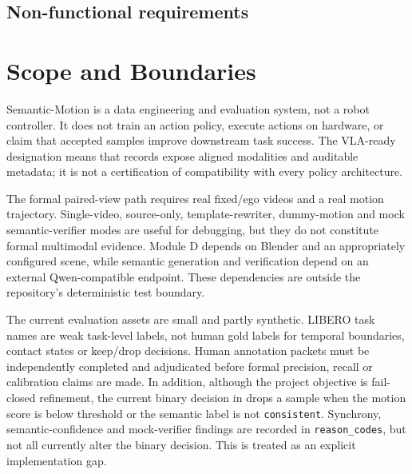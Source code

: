 \documentclass[11pt,oneside]{report}
\begin{document}
\subsection*{Non-functional requirements}

\section{Scope and Boundaries}
Semantic-Motion is a data engineering and evaluation system, not a robot
controller. It does not train an action policy, execute actions on hardware, or
claim that accepted samples improve downstream task success. The VLA-ready
designation means that records expose aligned modalities and auditable
metadata; it is not a certification of compatibility with every policy
architecture.

The formal paired-view path requires real fixed/ego videos and a real motion
trajectory. Single-video, source-only, template-rewriter, dummy-motion and mock
semantic-verifier modes are useful for debugging, but they do not constitute
formal multimodal evidence. Module D depends on Blender and an appropriately
configured scene, while semantic generation and verification depend on an
external Qwen-compatible endpoint. These dependencies are outside the
repository's deterministic test boundary.

The current evaluation assets are small and partly synthetic. LIBERO task names
are weak task-level labels, not human gold labels for temporal boundaries,
contact states or keep/drop decisions. Human annotation packets must be
independently completed and adjudicated before formal precision, recall or
calibration claims are made. In addition, although the project objective is
fail-closed refinement, the current binary decision in
 drops a sample when the motion score is
below threshold or the semantic label is not \texttt{consistent}. Synchrony,
semantic-confidence and mock-verifier findings are recorded in
\texttt{reason\_codes}, but not all currently alter the binary decision. This
is treated as an explicit implementation gap.
\end{document}
